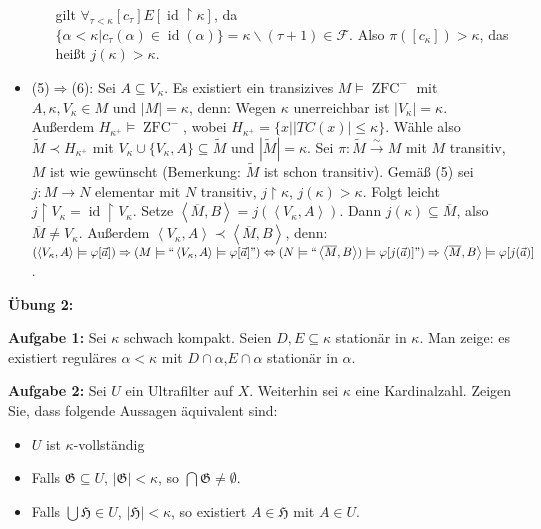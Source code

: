 \documentclass[a4paper,fontsize=11pt]{scrartcl}
\newcommand{\ZFC}{\operatorname{ZFC}}
\newcommand{\id}{\operatorname{id}}
\begin{document}
\begin{itemize}
\begin{itemize}
                   gilt
                   $\forall_{\tau<\kappa}[c_\tau]E[\id\upharpoonright\kappa]$,
                   da $\{\alpha<\kappa|c_\tau(\alpha)\in\id(\alpha)\}=
                   \kappa\backslash(\tau+1)\in\mathcal{F}$. Also
                   $\pi([c_\kappa])>\kappa$, das heißt
                   $j(\kappa)>\kappa$.
      \end{itemize}
    \item (5)$\Rightarrow$(6): Sei $A\subseteq V_\kappa$. Es existiert
      ein transizives $M\models\ZFC^-$ mit $A,\kappa,V_\kappa\in M$
      und $|M|=\kappa$, denn: Wegen $\kappa$ unerreichbar ist
      $|V_\kappa|=\kappa$. Außerdem $H_{\kappa^+}\models\ZFC^-$, wobei
      $H_{\kappa^+}=\{x||TC(x)|\le\kappa\}$. Wähle also
      $\tilde{M}\prec H_{\kappa^+}$ mit
      $V_\kappa\cup\{V_\kappa,A\}\subseteq\tilde{M}$ und
      $|\tilde{M}|=\kappa$. Sei
      $\pi:\tilde{M}\stackrel{\sim}{\rightarrow}M$ mit $M$ transitiv,
      $M$ ist wie gewünscht (Bemerkung: $\tilde{M}$ ist schon
      transitiv). Gemäß (5) sei $j:M\rightarrow N$ elementar mit $N$
      transitiv, $j\upharpoonright\kappa$, $j(\kappa)>\kappa$. Folgt
      leicht $j\upharpoonright V_\kappa = \id\upharpoonright
      V_\kappa$. Setze
      $\left<\overline{M},B\right>=j(\left<V_\kappa,A\right>)$. Dann
      $j(\kappa)\subseteq\overline{M}$, also $\overline{M}\neq
      V_\kappa$. Außerdem $\left<V_\kappa,
      A\right>\prec\left<\overline{M},B\right>$, denn:
      $(\left<V_\kappa,A\right>\models\varphi[\vec{a}])\Rightarrow
      (M\models\mbox{``}\left<V_\kappa,A\right>\models
      \varphi[\vec{a}]\mbox{\textquotedblright}) \Leftrightarrow
      (N\models\mbox{``}\left<\overline{M},B\right>) \models
      \varphi[j(\vec{a})]\mbox{\textquotedblright}) \Rightarrow
      \left<\overline{M},B\right>\models\varphi[j(\vec{a})]$.
\end{itemize}

{\bf Übung 2:}

{\bf Aufgabe 1:} Sei $\kappa$ schwach kompakt. Seien
$D,E\subseteq\kappa$ stationär in $\kappa$. Man zeige: es existiert
reguläres $\alpha<\kappa$ mit $D\cap\alpha$,$E\cap\alpha$ stationär in
$\alpha$.

{\bf Aufgabe 2:} Sei $U$ ein Ultrafilter auf $X$. Weiterhin sei
$\kappa$ eine Kardinalzahl. Zeigen Sie, dass folgende Aussagen
äquivalent sind:
\begin{itemize}
\item[(1)] $U$ ist $\kappa$-vollständig
\item[(2)] Falls $\mathfrak{G}\subseteq U$, $|\mathfrak{G}|<\kappa$,
  so $\bigcap\mathfrak{G}\neq\emptyset$.
\item[(3)] Falls $\bigcup\mathfrak{H}\in U$, $|\mathfrak{H}|<\kappa$,
  so existiert $A\in\mathfrak{H}$ mit $A\in U$.
\end{itemize}
\end{document}
